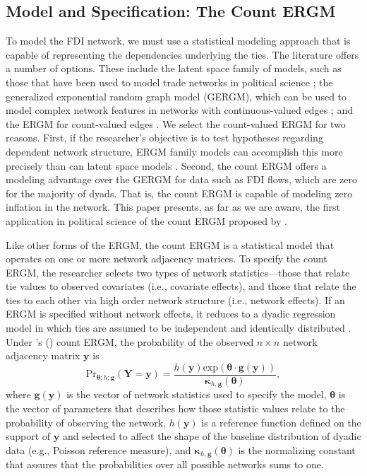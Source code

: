 \documentclass[reqno,onecolumn,letterpaper,12pt]{article}
\newcommand\citeapos[1]{\citeauthor{#1}'s (\citeyear{#1})}
\begin{document}
\subsection{Model and Specification: The Count ERGM}

To model the FDI network, we must use a statistical modeling approach that is capable of representing the dependencies underlying the ties. The literature offers a number of options. These include the latent space family of models, such as those that have been used to model trade networks in political science \citep{ward2007persistent,ward2013gravity}; the generalized exponential random graph model (GERGM), which can be used to model complex network features in networks with continuous-valued edges \citep{wilson2017stochastic}; and the ERGM for count-valued edges \citep{krivitsky2012exponential}. We select the count-valued ERGM for two reasons. First, if the researcher's objective is to test hypotheses regarding dependent network structure, ERGM family models can accomplish this more precisely than can latent space models \citep{cranmer2016critique,desmarais2017statistical}. Second, the count ERGM offers a modeling advantage over the GERGM for data such as FDI flows, which are zero for the majority of dyads. That is, the count ERGM is capable of modeling zero inflation in the network. This paper presents, as far as we are aware, the first application in political science of the count ERGM proposed by \cite{krivitsky2012exponential}.

Like other forms of the ERGM, the count ERGM is a statistical model that operates on one or more network adjacency matrices. To specify the count ERGM, the researcher selects two types of network statistics---those that relate tie values to observed covariates (i.e., covariate effects), and those that relate the ties to each other via high order network structure (i.e., network effects). If an ERGM is specified without network effects, it reduces to a dyadic regression model in which ties are assumed to be independent and identically distributed \citep{cranmer2011inferential}. Under \citeapos{krivitsky2012exponential} count ERGM, the probability of the observed $n \times n$ network adjacency matrix $\bm{y}$ is $$ \text{Pr}_{\bm{\theta};h;\bm{g}}( \bm{Y}=\bm{y} )=\frac{ h(\bm{y})\text{exp}( \bm {\theta} \cdot \bm{g} (\bm{y}) )}{\bm{\kappa}_{h,\bm{g}}(\bm{\theta})},$$ where $\bm{g}( \bm{y} )$ is the vector of network statistics used to specify the model, $\bm{\theta}$ is the vector of parameters that describes how those statistic values relate to the probability of observing the network, $h(\bm{y})$ is a reference function defined on the support of $\bm{y}$ and selected to affect the shape of the baseline distribution of dyadic data (e.g., Poisson reference measure), and $\bm{\kappa}_{h,\bm{g}}(\bm{\theta})$ is the normalizing constant that assures that the probabilities over all possible networks sums to one.
\end{document}
